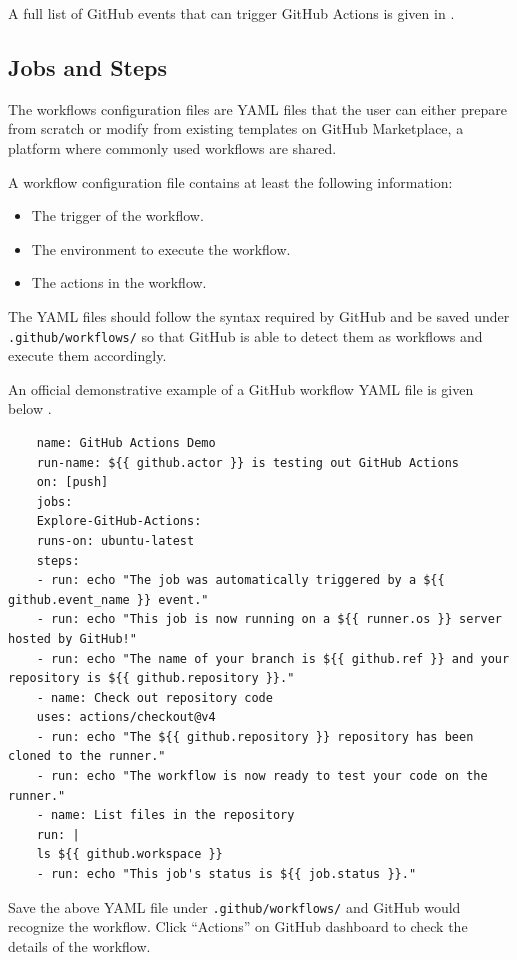 A full list of GitHub events that can trigger GitHub Actions is given in \cite{git2025reference}.

\subsection{Jobs and Steps}

The workflows configuration files are YAML files that the user can either prepare from scratch or modify from existing templates on GitHub Marketplace, a platform where commonly used workflows are shared.

A workflow configuration file contains at least the following information:
\begin{itemize}
	\item The trigger of the workflow.
	\item The environment to execute the workflow.
	\item The actions in the workflow.
\end{itemize}

The YAML files should follow the syntax required by GitHub and be saved under \verb|.github/workflows/| so that GitHub is able to detect them as workflows and execute them accordingly.

An official demonstrative example of a GitHub workflow YAML file is given below \cite{git2025reference}. 

\begin{lstlisting}
	name: GitHub Actions Demo
	run-name: ${{ github.actor }} is testing out GitHub Actions
	on: [push]
	jobs:
	Explore-GitHub-Actions:
	runs-on: ubuntu-latest
	steps:
	- run: echo "The job was automatically triggered by a ${{ github.event_name }} event."
	- run: echo "This job is now running on a ${{ runner.os }} server hosted by GitHub!"
	- run: echo "The name of your branch is ${{ github.ref }} and your repository is ${{ github.repository }}."
	- name: Check out repository code
	uses: actions/checkout@v4
	- run: echo "The ${{ github.repository }} repository has been cloned to the runner."
	- run: echo "The workflow is now ready to test your code on the runner."
	- name: List files in the repository
	run: |
	ls ${{ github.workspace }}
	- run: echo "This job's status is ${{ job.status }}."
\end{lstlisting}

Save the above YAML file under \verb|.github/workflows/| and GitHub would recognize the workflow. Click ``Actions'' on GitHub dashboard to check the details of the workflow.

